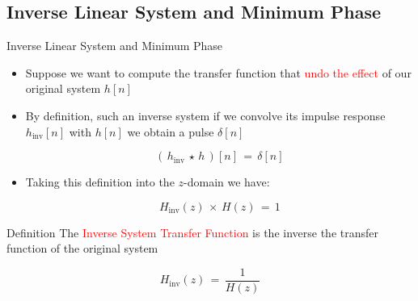\documentclass{beamer}
\begin{document}
\subsection{Inverse Linear System and Minimum Phase}

\begin{frame}[t]{Inverse Linear System and Minimum Phase}

\begin{itemize}

\item Suppose we want to compute the transfer function that \textcolor{red}{undo the effect} of our original system $h[n]$

\item By definition, such an inverse system if we convolve its impulse response $h_{\text{inv}}[n]$ with $h[n]$ we obtain a pulse $\delta[n]$

\begin{equation}
(\,h_{\text{inv}} \, \star \, h \,)[n] \, = \, \delta[n]
\end{equation}

\item Taking this definition into the $z$-domain we have:

\begin{equation}
H_{\text{inv}}(z) \, \times \, H(z) \, = \, 1 
\end{equation}

\end{itemize}

\begin{block}{Definition}
The \textcolor{red}{Inverse System Transfer Function} is the inverse the transfer function of the original system

	\begin{equation}
	H_{\text{inv}}(z) \, = \, \displaystyle\frac{1}{H(z)}
	\end{equation}
\end{block}


\end{frame}
\end{document}
